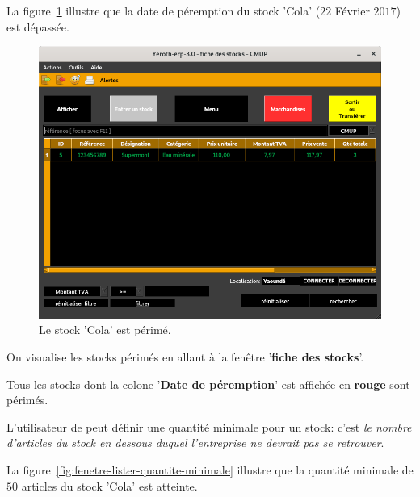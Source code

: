 La figure~\ref{fig:fenetre-lister-stock-perime} illustre
que la date de p\'eremption du stock 'Cola' ($22$ F\'evrier
$2017$) est d\'epass\'ee.\\

\begin{figure}[!htbp]
	\centering
	\includegraphics[scale=0.63]{images/yeren-fenetre-stocks-perimes.png}
	\caption{Le stock 'Cola' est p\'erim\'e.}
	\label{fig:fenetre-lister-stock-perime}
\end{figure}

On visualise les stocks p\'erim\'es en allant \`a la fen\^etre
'\textbf{fiche des stocks}'. 

Tous les stocks dont la colone '\textbf{Date de
	p\'eremption}' est affich\'ee en 
\textbf{\textcolor{firebrickred}{rouge}} sont p\'erim\'es.


\newpage
{}

L'utilisateur de \yeren peut d\'efinir une quantit\'e minimale
pour un stock: c'est \emph{le nombre d'articles du stock en dessous
duquel l'entreprise ne devrait pas se retrouver}.

La figure~\ref{fig:fenetre-lister-quantite-minimale} illustre
que la quantit\'e minimale de $50$ articles du stock 'Cola'
est atteinte.\\


